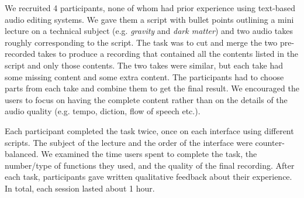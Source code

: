 We recruited 4 participants, none of whom had
prior experience using text-based audio editing systems. We gave them
a script with bullet points outlining a mini lecture on a technical
subject (e.g. \textit{gravity} and \textit{dark matter}) and
two audio takes roughly corresponding to the script.  The task
was to cut and merge the two pre-recorded takes to produce a recording that
contained all the contents listed in the script and only those
contents. The two takes were similar, but each take had some
missing content and some extra
content. The participants had to choose parts from each take
and combine them to get the final result. We encouraged the users
to focus on having the complete content rather than on the details
of the audio quality (e.g. tempo, diction, flow of speech etc.).


Each participant completed the task twice, once on each interface using different scripts.
The subject of the lecture and the order of the interface were
counter-balanced. We examined the time users spent to complete the task, the number/type of functions they used, and the quality of the
final recording. After each task, participants gave written
qualitative feedback about their experience. In total, each
session lasted about 1 hour.  
   
